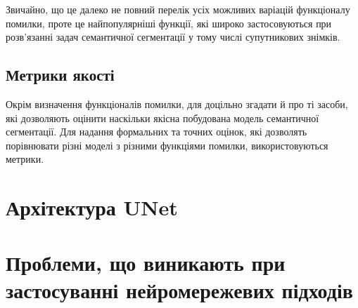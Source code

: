 Звичайно, що це далеко не повний перелік усіх можливих варіацій
функціоналу помилки, проте це найпопулярніші функції, які
широко застосовуються при розв'язанні задач семантичної
сегментації у тому числі супутникових знімків.

\subsection{Метрики якості}

Окрім визначення функціоналів помилки, для доцільно згадати й
про ті засоби, які дозволяють оцінити наскільки якісна побудована
модель семантичної сегментації.
Для надання формальних та точних оцінок, які дозволять порівнювати різні моделі
з різними функціями помилки, використовуються метрики.


\begin{definition}[IoU]\label{def:iou}

\end{definition}


\begin{definition}[Accuracy] \label{def:accuracy}

\end{definition}

\begin{definition} \label{def:user_accuracy}

\end{definition}

\begin{definition} \label{def:prod_accuracy}

\end{definition}

\section{Архітектура UNet}


\section{Проблеми, що виникають при застосуванні нейромережевих підходів}



\chapconclude{\ref{chap:review}}

